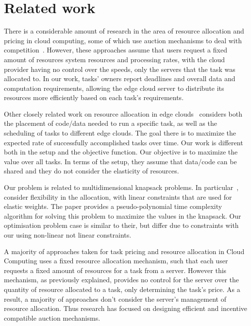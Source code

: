 \section{Related work}
\label{sec:related-work}
There is a considerable amount of research in the area of resource allocation and pricing in cloud computing, some of
which use auction mechanisms to deal with competition~\cite{KUMAR2017234,Zhang2017,Du2019,Bi2019}.
However, these approaches assume that users request a fixed amount of resources system resources and processing rates,
with the cloud provider having no control over the speeds, only the servers that the task was allocated to. In our
work, tasks' owners report deadlines and overall data and computation requirements, allowing the edge cloud server to
distribute its resources more efficiently based on each task's requirements.

Other closely related work on resource allocation in edge clouds~\cite{vaji_infocom} considers both the placement of
code/data needed to run a specific task, as well as the scheduling of tasks to different edge clouds. The goal there is
to maximize the expected rate of successfully accomplished tasks over time. Our work is different both in the setup and
the objective function. Our objective is to maximize the value over all tasks. In terms of the setup, they assume that
data/code can be shared and they do not consider the elasticity of resources.

Our problem is related to multidimensional knapsack problems. In particular~\cite{Nip2017}, consider flexibility in
the allocation, with linear constraints that are used for elastic weights. The paper provides a pseudo-polynomial time
complexity algorithm for solving this problem to maximize the values in the knapsack. Our optimisation problem case is
similar to their, but differ due to constraints with our using non-linear not linear constraints.

A majority of approaches taken for task pricing and resource allocation in Cloud Computing uses a fixed resource
allocation mechanism, such that each user requests a fixed amount of resources for a task from a server. However this
mechanism, as previously explained, provides no control for the server over the quantity of resource allocated to a task,
only determining the task's price. As a result, a majority of approaches don't consider the server's management of
resource allocation. Thus research has focused on designing efficient and incentive compatible auction mechanisms.

